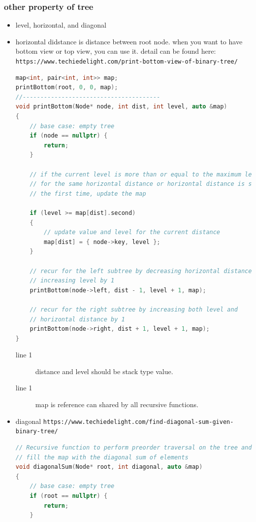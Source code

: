 \documentclass[a4paper,11pt,twoside]{book}
\begin{document}
\subsubsection{other property of tree}
\begin{itemize}
	\item level, horizontal, and diagonal 
	\item horizontal didstance is distance between root node.  when you want to have bottom view or top view, you can use it.  detail can be found here: \newline \verb|https://www.techiedelight.com/print-bottom-view-of-binary-tree/|
\begin{lstlisting}[frame=single, language=c++]
map<int, pair<int, int>> map;
printBottom(root, 0, 0, map);
//---------------------------------------	
void printBottom(Node* node, int dist, int level, auto &map)
{
	// base case: empty tree
	if (node == nullptr) {
		return;
	}
	
	// if the current level is more than or equal to the maximum level seen so far
	// for the same horizontal distance or horizontal distance is seen for
	// the first time, update the map
	
	if (level >= map[dist].second)
	{
		// update value and level for the current distance
		map[dist] = { node->key, level };
	}
	
	// recur for the left subtree by decreasing horizontal distance and
	// increasing level by 1
	printBottom(node->left, dist - 1, level + 1, map);
	
	// recur for the right subtree by increasing both level and
	// horizontal distance by 1
	printBottom(node->right, dist + 1, level + 1, map);
}
\end{lstlisting}
\begin{description}
	\item[line 1] distance and level should be stack type value.
	\item[line 1] map is reference can shared by all recursive functions. 
\end{description}

	\item diagonal  \verb|https://www.techiedelight.com/find-diagonal-sum-given-binary-tree/|
\begin{lstlisting}[frame=single, language=c++]
// Recursive function to perform preorder traversal on the tree and
// fill the map with the diagonal sum of elements
void diagonalSum(Node* root, int diagonal, auto &map)
{
	// base case: empty tree
	if (root == nullptr) {
		return;
	}
	

\end{lstlisting}
\end{itemize}
\end{document}
